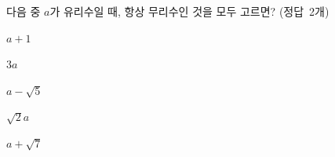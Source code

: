 다음 중 $a$가 유리수일 때, 항상 무리수인 것을 모두 고르면? \mbox{(정답 2개)}
\begin{choices32}{\rule[-3ex]{0pt}{8ex}$a+1$}{\rule[-3ex]{0pt}{8ex}$3a$}{\rule[-3ex]{0pt}{8ex}$a-\sqrt{5}$}{\rule[-3ex]{0pt}{8ex}$\sqrt{2}a$}{\rule[-3ex]{0pt}{8ex}$a+\sqrt{7}$}\end{choices32}
